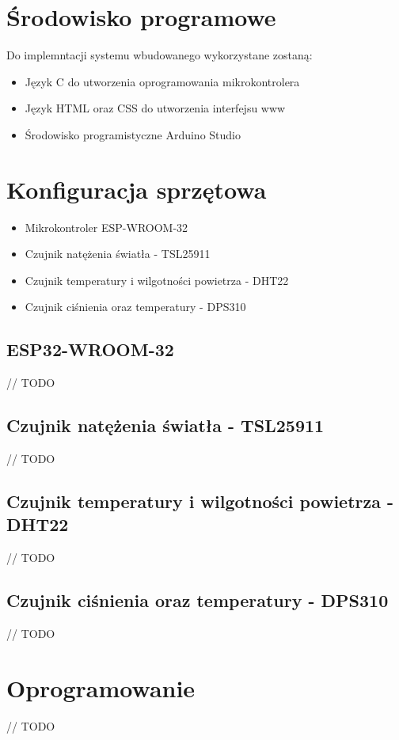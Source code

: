 \documentclass[12pt,a4paper]{article}
\begin{document}
\section{Środowisko programowe}
Do implemntacji systemu wbudowanego wykorzystane zostaną:
\begin{itemize}
    \item Język C do utworzenia oprogramowania mikrokontrolera
    \item Język HTML oraz CSS do utworzenia interfejsu www
    \item Środowisko programistyczne Arduino Studio
\end{itemize}

\section{Konfiguracja sprzętowa}

\begin{itemize}
    \item Mikrokontroler ESP-WROOM-32
    \item Czujnik natężenia światła - TSL25911
    \item Czujnik temperatury i wilgotności powietrza - DHT22
    \item Czujnik ciśnienia oraz temperatury - DPS310
\end{itemize}

\subsection{ESP32-WROOM-32}
// TODO

\subsection{Czujnik natężenia światła - TSL25911}
// TODO

\subsection{Czujnik temperatury i wilgotności powietrza - DHT22}
// TODO

\subsection{Czujnik ciśnienia oraz temperatury - DPS310}
// TODO

\section{Oprogramowanie}
// TODO
\end{document}
